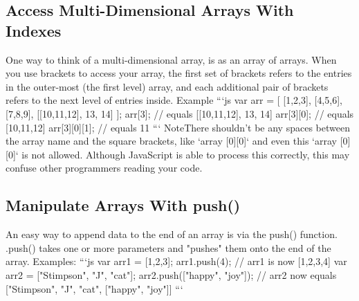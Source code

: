 \documentclass{article}%
\begin{document}
\subsection{Access Multi{-}Dimensional Arrays With Indexes}%
\label{subsec:AccessMulti{-}DimensionalArraysWithIndexes}%
One way to think of a multi{-}dimensional array, is as an array of arrays. When you use brackets to access your array, the first set of brackets refers to the entries in the outer{-}most (the first level) array, and each additional pair of brackets refers to the next level of entries inside.\newline%
Example\newline%
```js\newline%
var arr = {[}\newline%
  {[}1,2,3{]},\newline%
  {[}4,5,6{]},\newline%
  {[}7,8,9{]},\newline%
  {[}{[}10,11,12{]}, 13, 14{]}\newline%
{]};\newline%
arr{[}3{]}; // equals {[}{[}10,11,12{]}, 13, 14{]}\newline%
arr{[}3{]}{[}0{]}; // equals {[}10,11,12{]}\newline%
arr{[}3{]}{[}0{]}{[}1{]}; // equals 11\newline%
```\newline%
NoteThere shouldn't be any spaces between the array name and the square brackets, like `array {[}0{]}{[}0{]}` and even this `array {[}0{]} {[}0{]}` is not allowed. Although JavaScript is able to process this correctly, this may confuse other programmers reading your code.\newline%

%
\subsection{Manipulate Arrays With push()}%
\label{subsec:ManipulateArraysWithpush()}%
An easy way to append data to the end of an array is via the push() function.\newline%
.push() takes one or more parameters and "pushes" them onto the end of the array.\newline%
Examples:\newline%
```js\newline%
var arr1 = {[}1,2,3{]};\newline%
arr1.push(4);\newline%
// arr1 is now {[}1,2,3,4{]}\newline%
var arr2 = {[}"Stimpson", "J", "cat"{]};\newline%
arr2.push({[}"happy", "joy"{]});\newline%
// arr2 now equals {[}"Stimpson", "J", "cat", {[}"happy", "joy"{]}{]}\newline%
```\newline%
\end{document}

